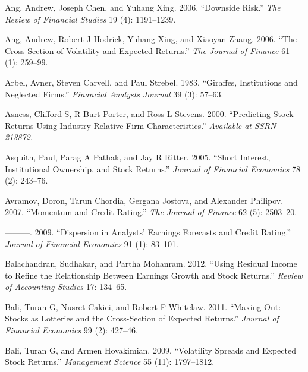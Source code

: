 \documentclass[
  letterpaper,
  DIV=11,
  numbers=noendperiod]{scrreprt}
\newlength{\cslhangindent}
\newlength{\cslentryspacingunit} %
\newenvironment{CSLReferences}[2] %
 {%
  \setlength{\parindent}{0pt}
  \ifodd #1
  \let\oldpar\par
  \def\par{\hangindent=\cslhangindent\oldpar}
  \fi
  \setlength{\parskip}{#2\cslentryspacingunit}
 }%
 {}
\begin{document}
\begin{CSLReferences}{1}{0}
\leavevmode{}%
Ang, Andrew, Joseph Chen, and Yuhang Xing. 2006. {``Downside Risk.''}
\emph{The Review of Financial Studies} 19 (4): 1191--1239.

\leavevmode{}%
Ang, Andrew, Robert J Hodrick, Yuhang Xing, and Xiaoyan Zhang. 2006.
{``The Cross-Section of Volatility and Expected Returns.''} \emph{The
Journal of Finance} 61 (1): 259--99.

\leavevmode{}%
Arbel, Avner, Steven Carvell, and Paul Strebel. 1983. {``Giraffes,
Institutions and Neglected Firms.''} \emph{Financial Analysts Journal}
39 (3): 57--63.

\leavevmode{}%
Asness, Clifford S, R Burt Porter, and Ross L Stevens. 2000.
{``Predicting Stock Returns Using Industry-Relative Firm
Characteristics.''} \emph{Available at SSRN 213872}.

\leavevmode{}%
Asquith, Paul, Parag A Pathak, and Jay R Ritter. 2005. {``Short
Interest, Institutional Ownership, and Stock Returns.''} \emph{Journal
of Financial Economics} 78 (2): 243--76.

\leavevmode{}%
Avramov, Doron, Tarun Chordia, Gergana Jostova, and Alexander Philipov.
2007. {``Momentum and Credit Rating.''} \emph{The Journal of Finance} 62
(5): 2503--20.

\leavevmode{}%
---------. 2009. {``Dispersion in Analysts' Earnings Forecasts and
Credit Rating.''} \emph{Journal of Financial Economics} 91 (1): 83--101.

\leavevmode{}%
Balachandran, Sudhakar, and Partha Mohanram. 2012. {``Using Residual
Income to Refine the Relationship Between Earnings Growth and Stock
Returns.''} \emph{Review of Accounting Studies} 17: 134--65.

\leavevmode{}%
Bali, Turan G, Nusret Cakici, and Robert F Whitelaw. 2011. {``Maxing
Out: Stocks as Lotteries and the Cross-Section of Expected Returns.''}
\emph{Journal of Financial Economics} 99 (2): 427--46.

\leavevmode{}%
Bali, Turan G, and Armen Hovakimian. 2009. {``Volatility Spreads and
Expected Stock Returns.''} \emph{Management Science} 55 (11):
1797--1812.


\end{CSLReferences}
\end{document}
